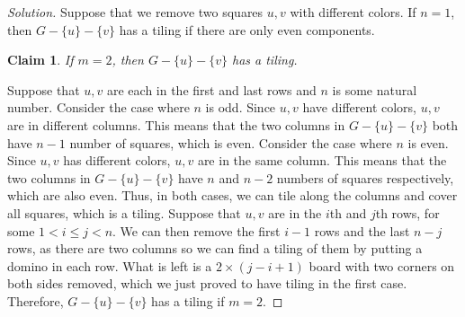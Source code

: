 \documentclass{article}
\newtheorem{claim}[thm]{Claim}
\begin{document}
\begin{enumerate}[label=(\alph*)]
\begin{proof}[Solution]
        Suppose that we remove two squares $u, v$ with different colors. If $n = 1$, then $G - \{u\} - \{v\}$ has a tiling if there are only even components.
        \begin{claim}
            If $m = 2$, then $G - \{u\} - \{v\}$ has a tiling.
        \end{claim}
            Suppose that $u, v$ are each in the first and last rows and $n$ is some natural number. Consider the case where $n$ is odd. Since $u, v$ have different colors, $u, v$ are in different columns. This means that the two columns in $G - \{u\} - \{v\}$ both have $n - 1$ number of squares, which is even. Consider the case where $n$ is even. Since $u, v$ has different colors, $u, v$ are in the same column. This means that the two columns in $G - \{u\} - \{v\}$ have $n$ and $n - 2$ numbers of squares respectively, which are also even. Thus, in both cases, we can tile along the columns and cover all squares, which is a tiling. Suppose that $u, v$ are in the $i$th and $j$th rows, for some $1 < i \leq j < n$. We can then remove the first $i - 1$ rows and the last $n - j$ rows, as there are two columns so we can find a tiling of them by putting a domino in each row. What is left is a $2 \times (j - i + 1)$ board with two corners on both sides removed, which we just proved to have tiling in the first case. Therefore, $G - \{u\} - \{v\}$ has a tiling if $m = 2$.
            

\end{proof}
\end{enumerate}
\end{document}
